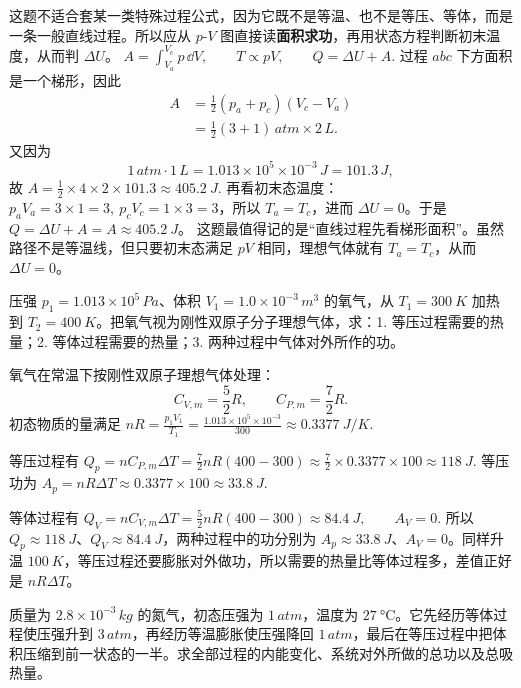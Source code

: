 \documentclass[lang=cn,11pt]{elegantbook}
\begin{document}
\begin{solution}
这题不适合套某一类特殊过程公式，因为它既不是等温、也不是等压、等体，而是一条一般直线过程。所以应从 \(p\)-\(V\) 图直接读\textbf{面积求功}，再用状态方程判断初末温度，从而判 \(\Delta U\)。
 \(A=\int_{V_a}^{V_c}p\,\dd V,\qquad T\propto pV,\qquad Q=\Delta U+A.\) 
过程 \(abc\) 下方面积是一个梯形，因此
\[
\begin{aligned}
A&=\frac12(p_a+p_c)(V_c-V_a)\\
&=\frac12(3+1)\,\si{atm}\times 2\,\si{L}.
\end{aligned}
\]
又因为
\[
1\,\si{atm}\cdot 1\,\si{L}=1.013\times10^5\times10^{-3}\,\si{J}=101.3\,\si{J},
\]
故
 \(A=\frac12\times4\times2\times101.3\approx \SI{405.2}{J}.\) 
再看初末态温度：\(p_aV_a=3\times1=3,\ p_cV_c=1\times3=3\)，所以 \(T_a=T_c\)，进而 \(\Delta U=0\)。于是 \(Q=\Delta U+A=A\approx \SI{405.2}{J}\)。
这题最值得记的是“直线过程先看梯形面积”。虽然路径不是等温线，但只要初末态满足 \(pV\) 相同，理想气体就有 \(T_a=T_c\)，从而 \(\Delta U=0\)。
\end{solution}

\begin{exercise}
压强 \(p_1=1.013\times10^5\,\si{Pa}\)、体积 \(V_1=1.0\times10^{-3}\,\si{m^3}\) 的氧气，从 \(T_1=\SI{300}{K}\) 加热到 \(T_2=\SI{400}{K}\)。把氧气视为刚性双原子分子理想气体，求：1. 等压过程需要的热量；2. 等体过程需要的热量；3. 两种过程中气体对外所作的功。
\end{exercise}

\begin{solution}
氧气在常温下按刚性双原子理想气体处理：
\[
C_{V,m}=\frac52R,\qquad C_{P,m}=\frac72R.
\]
初态物质的量满足
 \(nR=\frac{p_1V_1}{T_1} =\frac{1.013\times10^5\times10^{-3}}{300} \approx \SI{0.3377}{J/K}.\) 

等压过程有
 \(Q_p=nC_{P,m}\Delta T =\frac72 nR(400-300) \approx \frac72\times0.3377\times100 \approx \SI{118}{J}.\) 
等压功为
 \(A_p=nR\Delta T \approx 0.3377\times100 \approx \SI{33.8}{J}.\) 

等体过程有
 \(Q_V=nC_{V,m}\Delta T =\frac52 nR(400-300) \approx \SI{84.4}{J}, \qquad A_V=0.\) 
所以 \(Q_p\approx\SI{118}{J}\)、\(Q_V\approx\SI{84.4}{J}\)，两种过程中的功分别为 \(A_p\approx\SI{33.8}{J}\)、\(A_V=0\)。同样升温 \(\SI{100}{K}\)，等压过程还要膨胀对外做功，所以需要的热量比等体过程多，差值正好是 \(nR\Delta T\)。
\end{solution}

\begin{exercise}
质量为 \(2.8\times10^{-3}\,\si{kg}\) 的氮气，初态压强为 \(1\,\si{atm}\)，温度为 \(\SI{27}{\celsius}\)。它先经历等体过程使压强升到 \(3\,\si{atm}\)，再经历等温膨胀使压强降回 \(1\,\si{atm}\)，最后在等压过程中把体积压缩到前一状态的一半。求全部过程的内能变化、系统对外所做的总功以及总吸热量。
\end{exercise}
\end{document}
